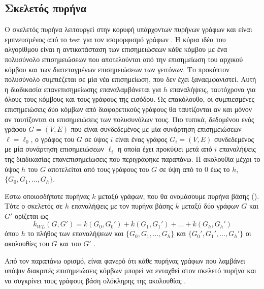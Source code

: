 \subsection{Σκελετός πυρήνα }
\label{sec:wl}
Ο σκελετός πυρήνα  λειτουργεί στην κορυφή υπάρχοντων πυρήνων γράφων και είναι εμπνευσμένος από το test  για τον ισομορφισμό γράφων \cite{weisfeiler1968reduction}.
Η κύρια ιδέα του αλγορίθμου  είναι η αντικατάσταση των επισημειώσεων κάθε κόμβου με ένα πολυσύνολο επισημειώσεων που αποτελούνται από την επισημείωση του αρχικού κόμβου και των διατεταγμένων επισημειώσεων των γειτόνων.
Το προκύπτον πολυσύνολο συμπιέζεται σε μία νέα επισημείωση, που δεν έχει ξαναεμφανιστεί.
Αυτή η διαδικασία επανεπισημείωσης επαναλαμβάνεται για $h$ επαναλήψεις, ταυτόχρονα για όλους τους κόμβους και τους γράφους της εισόδου.
Ως επακόλουθο, οι συμπιεσμένες επισημειώσεις δύο κόμβων από διαφορετικούς γράφους θα ταυτίζονται αν και μόνον αν ταυτίζονται οι επισημειώσεις των πολυσυνόλων τους.
Πιο τυπικά, δεδομένου ενός γράφου $G=(V,E)$ που είναι συνδεδεμένος με μία συνάρτηση επισημειώσεων $\ell=\ell_0$, ο γράφος  του $G$ σε ύψος $i$ είναι ένας γράφος $G_i=(V,E)$ συνδεδεμένος με μία συνάρτηση επισημειώσεων $\ell_i$ η οποία έχει προκύψει μετά από $i$ επαναλήψεις της διαδικασίας επανεπισημείωσεις που περιγράφηκε παραπάνω.
Η ακολουθία  μέχρι το ύψος $h$ του $G$ αποτελείται από τους γράφους  του $G$ σε ύψη από το $0$ έως το $h$, $\{ G_0,G_1,\ldots,G_h\}$. 
\begin{definition}
	Έστω οποιοσδήποτε πυρήνας $k$ μεταξύ γράφων, που θα ονομάσουμε πυρήνα βάσης ().
	Τότε ο σκελετός  σε $h$ επαναλήψεις με τον πυρήνα βάσης $k$ μεταξύ δύο γράφων $G$ και $G'$ ορίζεται ως
	\begin{equation}
		k_{WL}(G,G') = k(G_0,G_0') + k(G_1,G_1') + \ldots + k(G_h,G_h')
	\end{equation}
	όπου $h$ το πλήθος των επαναλήψεων  και $\{ G_0,G_1,\ldots,G_h\}$ και $\{ G_0',G_1',\ldots,G_h'\}$ οι ακολουθίες  του $G$ και του $G'$ .
\end{definition}
Από τον παραπάνω ορισμό, είναι φανερό ότι κάθε πυρήνας γράφων που λαμβάνει υπόψιν διακριτές επισημειώσεις κόμβων μπορεί να ενταχθεί στον σκελετό πυρήνα  και να συγκρίνει τους γράφους βάση ολόκληρης της ακολουθίας .\par

